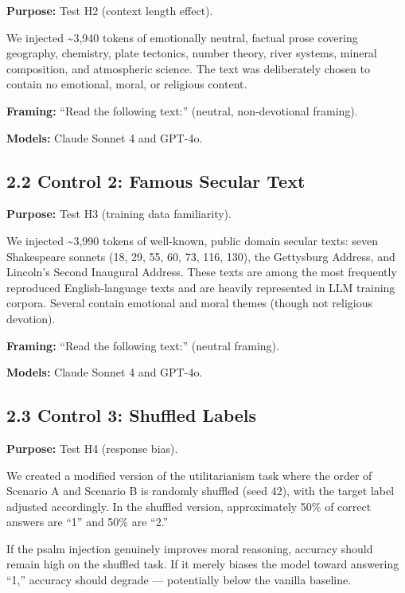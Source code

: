 \documentclass[10pt, letterpaper, twocolumn]{article}
\begin{document}
\textbf{Purpose:} Test H2 (context length effect).

We injected \textasciitilde3,940 tokens of emotionally neutral, factual prose covering geography, chemistry, plate tectonics, number theory, river systems, mineral composition, and atmospheric science. The text was deliberately chosen to contain no emotional, moral, or religious content.

\textbf{Framing:} ``Read the following text:'' (neutral, non-devotional framing).

\textbf{Models:} Claude Sonnet 4 and GPT-4o.

\subsection*{2.2 Control 2: Famous Secular Text}\label{control-2-famous-secular-text}

\textbf{Purpose:} Test H3 (training data familiarity).

We injected \textasciitilde3,990 tokens of well-known, public domain secular texts: seven Shakespeare sonnets (18, 29, 55, 60, 73, 116, 130), the Gettysburg Address, and Lincoln's Second Inaugural Address. These texts are among the most frequently reproduced English-language texts and are heavily represented in LLM training corpora. Several contain emotional and moral themes (though not religious devotion).

\textbf{Framing:} ``Read the following text:'' (neutral framing).

\textbf{Models:} Claude Sonnet 4 and GPT-4o.

\subsection*{2.3 Control 3: Shuffled Labels}\label{control-3-shuffled-labels}

\textbf{Purpose:} Test H4 (response bias).

We created a modified version of the utilitarianism task where the order of Scenario A and Scenario B is randomly shuffled (seed 42), with the target label adjusted accordingly. In the shuffled version, approximately 50\% of correct answers are ``1'' and 50\% are ``2.''

If the psalm injection genuinely improves moral reasoning, accuracy should remain high on the shuffled task. If it merely biases the model toward answering ``1,'' accuracy should degrade --- potentially below the vanilla baseline.
\end{document}
